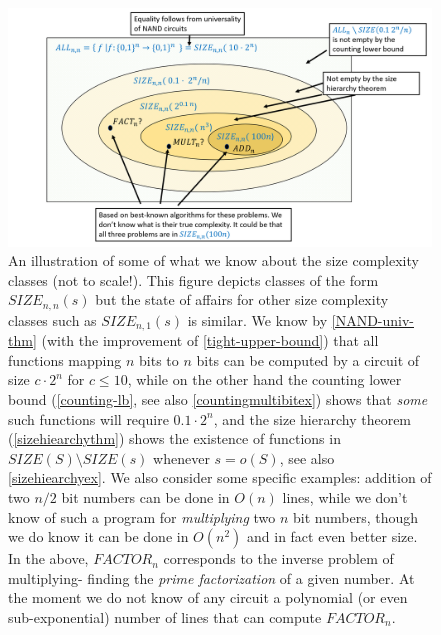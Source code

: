 \begin{figure}
\centering
\includegraphics[width=\textwidth, height=0.25\paperheight, keepaspectratio]{../figure/sizecomplexity.png}
\caption{An illustration of some of what we know about the size
complexity classes (not to scale!). This figure depicts classes of the
form \(\ensuremath{\mathit{SIZE}}_{n,n}(s)\) but the state of affairs
for other size complexity classes such as
\(\ensuremath{\mathit{SIZE}}_{n,1}(s)\) is similar. We know by
\cref{NAND-univ-thm} (with the improvement of \cref{tight-upper-bound})
that all functions mapping \(n\) bits to \(n\) bits can be computed by a
circuit of size \(c \cdot 2^n\) for \(c \leq 10\), while on the other
hand the counting lower bound (\cref{counting-lb}, see also
\cref{countingmultibitex}) shows that \emph{some} such functions will
require \(0.1 \cdot 2^n\), and the size hierarchy theorem
(\cref{sizehiearchythm}) shows the existence of functions in
\(\ensuremath{\mathit{SIZE}}(S) \setminus \ensuremath{\mathit{SIZE}}(s)\)
whenever \(s=o(S)\), see also \cref{sizehiearchyex}. We also consider
some specific examples: addition of two \(n/2\) bit numbers can be done
in \(O(n)\) lines, while we don't know of such a program for
\emph{multiplying} two \(n\) bit numbers, though we do know it can be
done in \(O(n^2)\) and in fact even better size. In the above,
\(\ensuremath{\mathit{FACTOR}}_n\) corresponds to the inverse problem of
multiplying- finding the \emph{prime factorization} of a given number.
At the moment we do not know of any circuit a polynomial (or even
sub-exponential) number of lines that can compute
\(\ensuremath{\mathit{FACTOR}}_n\).}
\label{sizeclassesfig}
\end{figure}

\hypertarget{explicitfunc}{}

